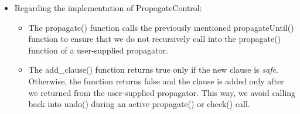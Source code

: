 \begin{itemize}
  \item Regarding the implementation of PropagateControl:
  \begin{itemize}
    \item The propagate() function calls the previously mentioned propagateUntil() function to ensure
          that we do not recursively call into the propagate() function of a user-supplied propagator.
    \item The add\_clause() function returns true only if the new clause is \emph{safe}. Otherwise,
          the function returns false and the clause is added only after we returned from the
          user-supplied propagator. This way, we avoid calling back into undo() during an active propagate()
          or check() call.
  \end{itemize}

\end{itemize}


